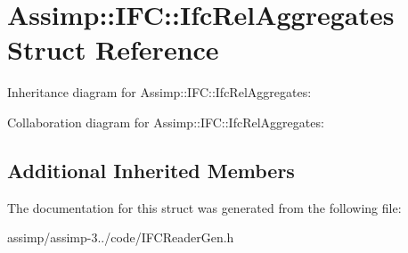 \hypertarget{struct_assimp_1_1_i_f_c_1_1_ifc_rel_aggregates}{\section{Assimp\+:\+:I\+F\+C\+:\+:Ifc\+Rel\+Aggregates Struct Reference}
\label{struct_assimp_1_1_i_f_c_1_1_ifc_rel_aggregates}
}


Inheritance diagram for Assimp\+:\+:I\+F\+C\+:\+:Ifc\+Rel\+Aggregates\+:


Collaboration diagram for Assimp\+:\+:I\+F\+C\+:\+:Ifc\+Rel\+Aggregates\+:
\subsection*{Additional Inherited Members}


The documentation for this struct was generated from the following file\+:\begin{DoxyCompactItemize}
\item 
assimp/assimp-\/3../code/I\+F\+C\+Reader\+Gen.\+h\end{DoxyCompactItemize}
